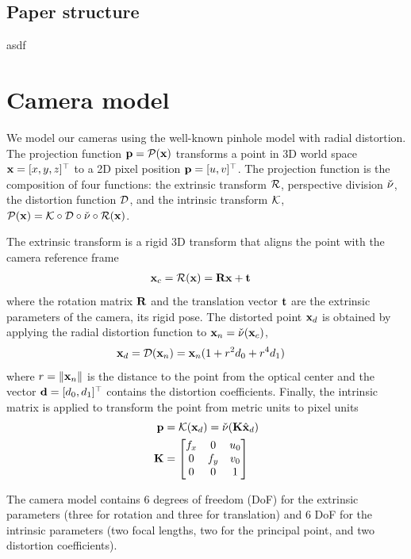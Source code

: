 \documentclass[10pt,twocolumn,letterpaper]{article}
\begin{document}
\subsection{Paper structure}
asdf

\section{Camera model}

We model our cameras using the well-known pinhole model with radial distortion. The projection function $\mathbf{p}=\mathcal{P}(\mathbf{x})$ transforms a point in 3D world space $\mathbf{x}=[x,y,z]^\top$ to a 2D pixel position $\mathbf{p}=[u,v]^\top$. The projection function is the composition of four functions: the extrinsic transform $\mathcal{R}$, perspective division $\check{\nu}$, the distortion function $\mathcal{D}$, and the intrinsic transform $\mathcal{K}$, \ie $\mathcal{P}(\mathbf{x}) = \mathcal{K} \circ \mathcal{D} \circ \check{\nu} \circ \mathcal{R}(\mathbf{x})$.

The extrinsic transform is a rigid 3D transform that aligns the point with the camera reference frame
%
\begin{align}
\mathbf{x}_c &= \mathcal{R}(\mathbf{x}) = \mathbf{R} \mathbf{x} + \mathbf{t} 
\end{align}
%
where the rotation matrix $\mathbf{R}$ and the translation vector $\mathbf{t}$ are the extrinsic parameters of the camera, \ie its rigid pose. The distorted point $\mathbf{x}_d$ is obtained by applying the radial distortion function to $\mathbf{x}_n = \check{\nu}(\mathbf{x}_c)$, \ie
%
\begin{align}
\mathbf{x}_d = \mathcal{D}(\mathbf{x}_n) &= \mathbf{x}_n (1+r^2 d_0 + r^4 d_1)
\label{eq:distortion}
\end{align}
%
where $r = \lVert\mathbf{x}_n\rVert$ is the distance to the point from the optical center and the vector $\mathbf{d}=[d_0,d_1]^\top$ contains the distortion coefficients. Finally, the intrinsic matrix is applied to transform the point from metric units to pixel units
%
\begin{align}
\mathbf{p} &= \mathcal{K}(\mathbf{x}_d) = \check{\nu}(\mathbf{K} \hat{\mathbf{x}}_d)
\\
\mathbf{K} &= \begin{bmatrix}
f_x & 0 & u_0 \\
0 & f_y & v_0 \\
0 & 0 & 1
\end{bmatrix}
\label{eq:intrinsic_matrix}
\end{align}
%

The camera model contains 6 degrees of freedom (DoF) for the extrinsic parameters (three for rotation and three for translation) and 6 DoF for the intrinsic parameters (two focal lengths, two for the principal point, and two distortion coefficients). 
\end{document}
